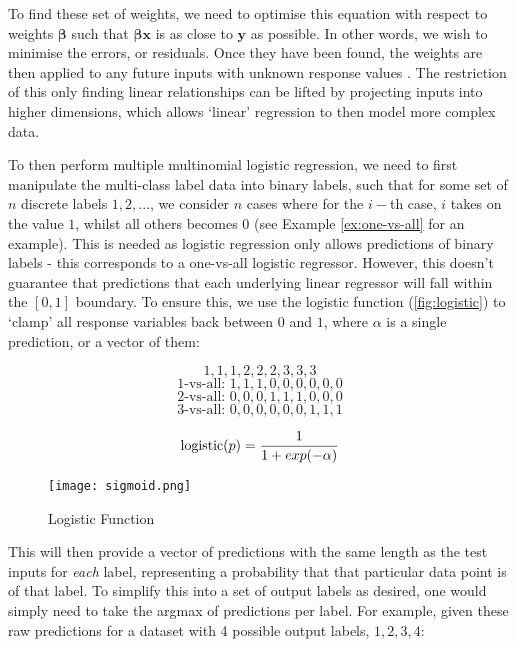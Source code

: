 To find these set of weights, we need to optimise this equation with respect to weights $\mathbf{\beta}$ such that $\mathbf{\beta x}$ is as close to $\mathbf{y}$ as possible. In other words, we wish to minimise the errors, or residuals. Once they have been found, the weights are then applied to any future inputs with unknown response values . The restriction of this only finding linear relationships can be lifted by projecting inputs into higher dimensions, which allows `linear' regression to then model more complex data.

To then perform multiple multinomial logistic regression, we need to first manipulate the multi-class label data into binary labels, such that for some set of $n$ discrete labels $1, 2,...$, we consider $n$ cases where for the $i-$th case, $i$ takes on the value $1$, whilst all others becomes $0$ (see Example \autoref{ex:one-vs-all} for an example). This is needed as logistic regression only allows predictions of binary labels - this corresponds to a one-vs-all logistic regressor. However, this doesn't guarantee that predictions that each underlying linear regressor will fall within the $[0, 1]$ boundary. To ensure this, we use the logistic function (\autoref{fig:logistic}) to `clamp' all response variables back between $0$ and $1$, where $\alpha$ is a single prediction, or a vector of them:

\begin{ex} \label{ex:one-vs-all}
    $$1, 1, 1, 2, 2, 2, 3, 3, 3$$
    $$1\text{-vs-all: }1, 1, 1, 0, 0, 0, 0, 0, 0$$ 
    $$2\text{-vs-all: }0, 0, 0, 1, 1, 1, 0, 0, 0$$ 
    $$3\text{-vs-all: }0, 0, 0, 0, 0, 0, 1, 1, 1$$
\end{ex}

\begin{equation} \label{eq:logistic}
    \operatorname{logistic}(p) = \frac{1}{1+exp(-\alpha)}
\end{equation}

\begin{figure}
    \texttt{[image: sigmoid.png]}
    \caption{Logistic Function}
    \label{fig:logistic}
\end{figure}

This will then provide a vector of predictions with the same length as the test inputs for \textit{each} label, representing a probability that that particular data point is of that label. To simplify this into a set of output labels as desired, one would simply need to take the argmax of predictions per label. For example, given these raw predictions for a dataset with 4 possible output labels, $1, 2, 3, 4$:

